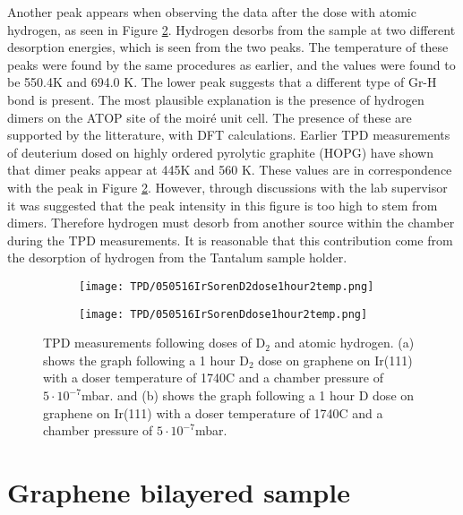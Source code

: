 Another peak appears when observing the data after the dose with atomic hydrogen, as seen in Figure \ref{TPD:D}. Hydrogen desorbs from the sample at two different desorption energies, which is seen from the two peaks. The temperature of these peaks were found by the same procedures as earlier, and the values were found to be 550.4K and 694.0 K. The lower peak suggests that a different type of Gr-H bond is present. The most plausible explanation is the presence of hydrogen dimers on the ATOP site of the moiré unit cell. The presence of these are supported by the litterature, with DFT calculations.\cite{balog2013controlling} Earlier TPD measurements of deuterium dosed on highly ordered pyrolytic graphite (HOPG) have shown that dimer peaks appear at 445K and 560 K.\cite{hornekaer2006metastable} These values are in correspondence with the peak in Figure \ref{TPD:D}. However, through discussions with the lab supervisor it was suggested that the peak intensity in this figure is too high to stem from dimers. Therefore hydrogen must desorb from another source within the chamber during the TPD measurements. It is reasonable that this contribution come from the desorption of hydrogen from the Tantalum sample holder.

\begin{figure}
  \centering
  \begin{subfigure}[b]{0.45\textwidth}
    \texttt{[image: TPD/050516IrSorenD2dose1hour2temp.png]}
    \caption{}
    \label{TPD:D2}
  \end{subfigure}\hspace{0.5cm}
  \begin{subfigure}[b]{0.45\textwidth}
    \texttt{[image: TPD/050516IrSorenDdose1hour2temp.png]}
    \caption{}
    \label{TPD:D}
  \end{subfigure}
  \caption{TPD measurements following doses of D$_2$ and atomic hydrogen. (a) shows the graph following a 1 hour D$_2$ dose on graphene on Ir(111) with a doser temperature of 1740\degree C and a chamber pressure of $5\cdot 10^{-7}$mbar. and (b) shows the graph following a 1 hour D dose on graphene on Ir(111) with a doser temperature of 1740\degree C and a chamber pressure of $5\cdot 10^{-7}$mbar.}
  \label{TPD:all}
\end{figure}

\section{Graphene bilayered sample}

